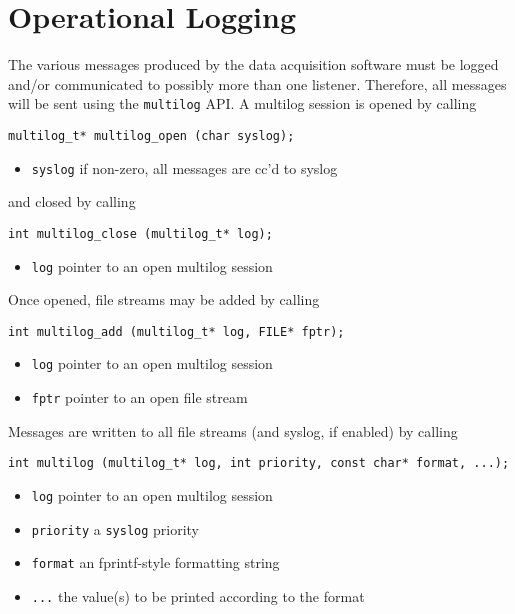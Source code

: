 \chapter{Operational Logging}

The various messages produced by the data acquisition software must be
logged and/or communicated to possibly more than one listener.  Therefore,
all messages will be sent using the {\tt multilog} API.  A multilog session
is opened by calling
\begin{verbatim}
multilog_t* multilog_open (char syslog);
\end{verbatim}
\vspace{-6mm}
\begin{itemize}
\item {\tt syslog} if non-zero, all messages are cc'd to syslog
\end{itemize}
and closed by calling
\begin{verbatim}
int multilog_close (multilog_t* log);
\end{verbatim}
\vspace{-6mm}
\begin{itemize}
\item {\tt log} pointer to an open multilog session
\end{itemize}
Once opened, file streams may be added by calling
\begin{verbatim}
int multilog_add (multilog_t* log, FILE* fptr);
\end{verbatim}
\vspace{-6mm}
\begin{itemize}
\item {\tt log} pointer to an open multilog session
\vspace{-2mm}
\item {\tt fptr} pointer to an open file stream
\end{itemize}
Messages are written to all file streams (and syslog, if enabled) by calling
\begin{verbatim}
int multilog (multilog_t* log, int priority, const char* format, ...);
\end{verbatim}
\vspace{-6mm}
\begin{itemize}
\item {\tt log} pointer to an open multilog session
\vspace{-2mm}
\item {\tt priority} a {\tt syslog} priority
\vspace{-2mm}
\item {\tt format} an fprintf-style formatting string
\vspace{-2mm}
\item {\tt ...} the value(s) to be printed according to the format
\end{itemize}

